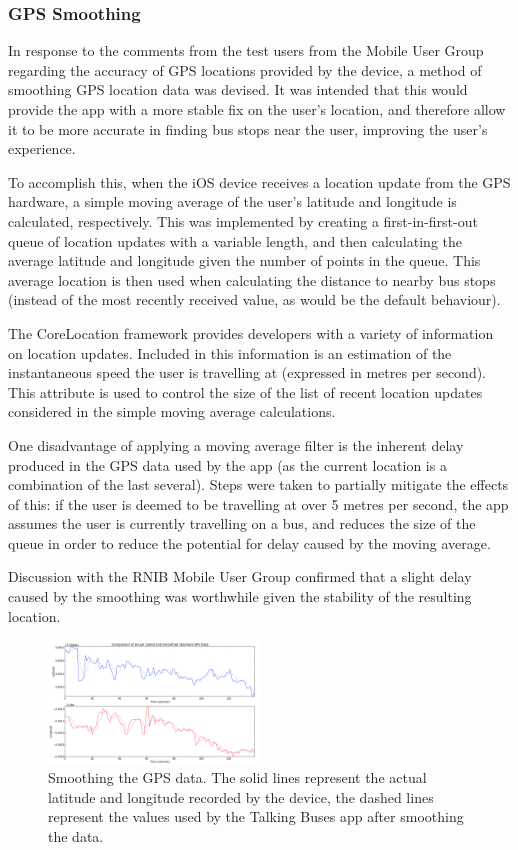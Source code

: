 \documentclass[10pt,twocolumn]{article}
\begin{document}
\subsubsection{GPS Smoothing}
In response to the comments from the test users from the Mobile User Group regarding the accuracy of GPS locations provided by the device, a method of smoothing GPS location data was devised. It was intended that this would provide the app with a more stable fix on the user's location, and therefore allow it to be more accurate in finding bus stops near the user, improving the user's experience.

To accomplish this, when the iOS device receives a location update from the GPS hardware, a simple moving average of the user's latitude and longitude is calculated, respectively. This was implemented by creating a first-in-first-out queue of location updates with a variable length, and then calculating the average latitude and longitude given the number of points in the queue. This average location is then used when calculating the distance to nearby bus stops (instead of the most recently received value, as would be the default behaviour).

The CoreLocation framework provides developers with a variety of information on location updates. Included in this information is an estimation of the instantaneous speed the user is travelling at (expressed in metres per second). This attribute is used to control the size of the list of recent location updates considered in the simple moving average calculations.

One disadvantage of applying a moving average filter is the inherent delay produced in the GPS data used by the app (as the current location is a combination of the last several). Steps were taken to partially mitigate the effects of this: if the user is deemed to be travelling at over 5 metres per second, the app assumes the user is currently travelling on a bus, and reduces the size of the queue in order to reduce the potential for delay caused by the moving average.

Discussion with the RNIB Mobile User Group confirmed that a slight delay caused by the smoothing was worthwhile given the stability of the resulting location.

\begin{figure}[htbp]
  \centering
    \includegraphics[width=0.5\textwidth]{smoothGraph}
    \caption{Smoothing the GPS data. The solid lines represent the actual latitude and longitude recorded by the device, the dashed lines represent the values used by  the Talking Buses app after smoothing the data.}
\end{figure}
\end{document}
